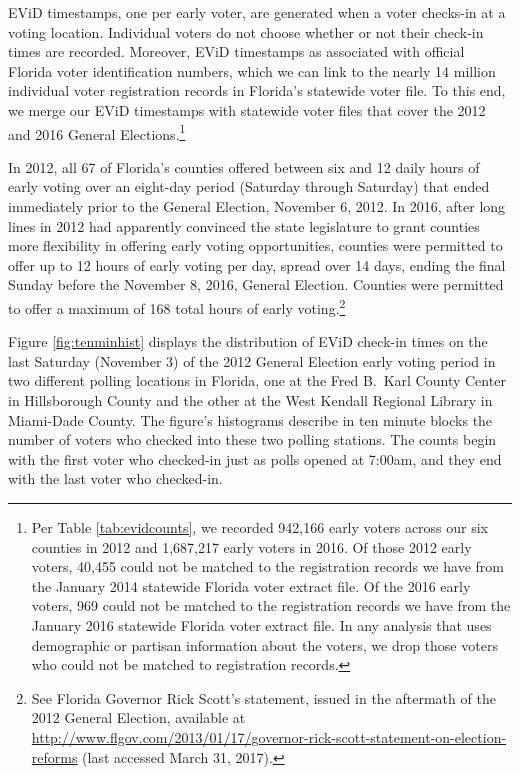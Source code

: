 \documentclass[12pt,titlepage]{article}
\begin{document}


EViD timestamps, one per early voter, are generated when a voter
checks-in at a voting location.  Individual voters do not choose
whether or not their check-in times are recorded.  Moreover, EViD
timestamps as associated with official Florida voter identification
numbers, which we can link to the nearly 14 million individual voter
registration records in Florida's statewide voter file.  To this end,
we merge our EViD timestamps with statewide voter files that cover the
2012 and 2016 General Elections.\footnote{Per Table
  \ref{tab:evidcounts}, we recorded 942,166 early voters across our
  six counties in 2012 and 1,687,217 early voters in 2016.  Of those
  2012 early voters, 40,455 could not be matched to the registration
  records we have from the January 2014 statewide Florida voter
  extract file.  Of the 2016 early voters, 969 could not be matched to
  the registration records we have from the January 2016 statewide
  Florida voter extract file.  In any analysis that uses demographic
  or partisan information about the voters, we drop those voters who
  could not be matched to registration records.}




In 2012, all 67 of Florida's counties offered between six and 12 daily
hours of early voting over an eight-day period (Saturday through
Saturday) that ended immediately prior to the General Election,
November 6, 2012.  In 2016, after long lines in 2012 had apparently
convinced the state legislature to grant counties more flexibility in
offering early voting opportunities, counties were permitted to offer
up to 12 hours of early voting per day, spread over 14 days, ending
the final Sunday before the November 8, 2016, General Election.
Counties were permitted to offer a maximum of 168 total hours of early
voting.\footnote{See Florida Governor Rick Scott's statement, issued
  in the aftermath of the 2012 General Election, available at
  \url{http://www.flgov.com/2013/01/17/governor-rick-scott-statement-on-election-reforms}
  (last accessed March 31, 2017).}

Figure \ref{fig:tenminhist} displays the distribution of EViD check-in
times on the last Saturday (November 3) of the 2012 General Election
early voting period in two different polling locations in Florida, one
at the Fred B.\ Karl County Center in Hillsborough County and the
other at the West Kendall Regional Library in Miami-Dade County.  The
figure's histograms describe in ten minute blocks the number of voters
who checked into these two polling stations.  The counts begin with
the first voter who checked-in just as polls opened at 7:00am, and
they end with the last voter who checked-in.
\end{document}
